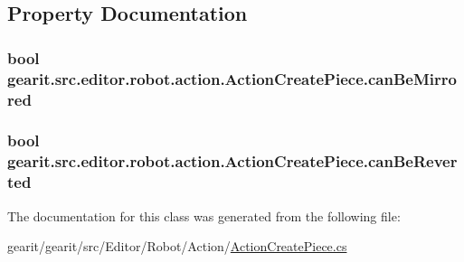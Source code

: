 \subsection{Property Documentation}
\hypertarget{classgearit_1_1src_1_1editor_1_1robot_1_1action_1_1_action_create_piece_ad94cea6720d509bb34e310e152671e34}{
\subsubsection[{can\+Be\+Mirrored}]{\setlength{\rightskip}{0pt plus 5cm}bool gearit.\+src.\+editor.\+robot.\+action.\+Action\+Create\+Piece.\+can\+Be\+Mirrored\hspace{0.3cm}{\ttfamily [get]}}}\label{classgearit_1_1src_1_1editor_1_1robot_1_1action_1_1_action_create_piece_ad94cea6720d509bb34e310e152671e34}
\hypertarget{classgearit_1_1src_1_1editor_1_1robot_1_1action_1_1_action_create_piece_a6df51f74db21c39a64611ae16e240e19}{
\subsubsection[{can\+Be\+Reverted}]{\setlength{\rightskip}{0pt plus 5cm}bool gearit.\+src.\+editor.\+robot.\+action.\+Action\+Create\+Piece.\+can\+Be\+Reverted\hspace{0.3cm}{\ttfamily [get]}}}\label{classgearit_1_1src_1_1editor_1_1robot_1_1action_1_1_action_create_piece_a6df51f74db21c39a64611ae16e240e19}


The documentation for this class was generated from the following file\+:\begin{DoxyCompactItemize}
\item 
gearit/gearit/src/\+Editor/\+Robot/\+Action/\hyperlink{_action_create_piece_8cs}{Action\+Create\+Piece.\+cs}\end{DoxyCompactItemize}
